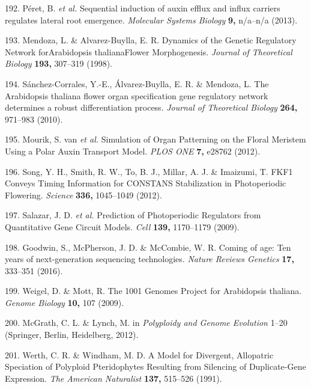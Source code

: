 \documentclass[12pt,]{book}
\begin{document}
\hypertarget{ref-peret_sequential_2013}{}
192. Péret, B. \emph{et al.} Sequential induction of auxin efflux and
influx carriers regulates lateral root emergence. \emph{Molecular
Systems Biology} \textbf{9,} n/a--n/a (2013).

\hypertarget{ref-mendoza_dynamics_1998}{}
193. Mendoza, L. \& Alvarez-Buylla, E. R. Dynamics of the Genetic
Regulatory Network forArabidopsis thalianaFlower Morphogenesis.
\emph{Journal of Theoretical Biology} \textbf{193,} 307--319 (1998).

\hypertarget{ref-sanchez_corrales_arabidopsis_2010}{}
194. Sánchez-Corrales, Y.-E., Álvarez-Buylla, E. R. \& Mendoza, L. The
Arabidopsis thaliana flower organ specification gene regulatory network
determines a robust differentiation process. \emph{Journal of
Theoretical Biology} \textbf{264,} 971--983 (2010).

\hypertarget{ref-van_mourik_simulation_2012}{}
195. Mourik, S. van \emph{et al.} Simulation of Organ Patterning on the
Floral Meristem Using a Polar Auxin Transport Model. \emph{PLOS ONE}
\textbf{7,} e28762 (2012).

\hypertarget{ref-song_fkf1_2012}{}
196. Song, Y. H., Smith, R. W., To, B. J., Millar, A. J. \& Imaizumi, T.
FKF1 Conveys Timing Information for CONSTANS Stabilization in
Photoperiodic Flowering. \emph{Science} \textbf{336,} 1045--1049 (2012).

\hypertarget{ref-salazar_prediction_2009}{}
197. Salazar, J. D. \emph{et al.} Prediction of Photoperiodic Regulators
from Quantitative Gene Circuit Models. \emph{Cell} \textbf{139,}
1170--1179 (2009).

\hypertarget{ref-goodwin_coming_2016}{}
198. Goodwin, S., McPherson, J. D. \& McCombie, W. R. Coming of age: Ten
years of next-generation sequencing technologies. \emph{Nature Reviews
Genetics} \textbf{17,} 333--351 (2016).

\hypertarget{ref-weigel_1001_2009}{}
199. Weigel, D. \& Mott, R. The 1001 Genomes Project for Arabidopsis
thaliana. \emph{Genome Biology} \textbf{10,} 107 (2009).

\hypertarget{ref-mcgrath_evolutionary_2012}{}
200. McGrath, C. L. \& Lynch, M. in \emph{Polyploidy and Genome
Evolution} 1--20 (Springer, Berlin, Heidelberg, 2012).

\hypertarget{ref-werth_model_1991}{}
201. Werth, C. R. \& Windham, M. D. A Model for Divergent, Allopatric
Speciation of Polyploid Pteridophytes Resulting from Silencing of
Duplicate-Gene Expression. \emph{The American Naturalist} \textbf{137,}
515--526 (1991).
\end{document}
